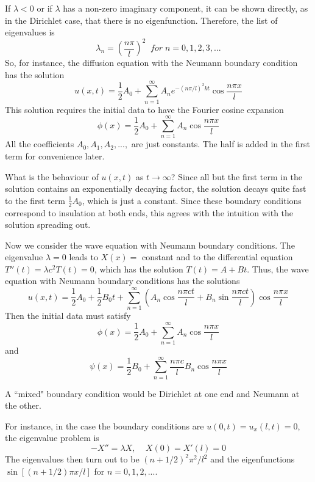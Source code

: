 \documentclass[12pt, a4paper, oneside, openright, titlepage]{book}
\begin{document}
If $\lambda < 0$ or if $\lambda$ has a non-zero imaginary component, it can be shown directly, as in the Dirichlet case, that there is no eigenfunction. Therefore, the list of eigenvalues is \begin{equation}
    \boxed{\lambda_n = \left(\frac{n\pi}{l}\right)^2\;\;for\;n = 0,1,2,3,...}
\end{equation}
So, for instance, the diffusion equation with the Neumann boundary condition has the solution \begin{equation}
    u(x,t) = \frac{1}{2}A_0 + \sum_{n=1}^{\infty}A_ne^{-(n\pi/l)^2kt}\cos\frac{n\pi x}{l}
\end{equation}
This solution requires the initial data to have the Fourier cosine expansion \begin{equation}
    \phi(x) = \frac{1}{2}A_0+\sum_{n=1}^{\infty}A_n\cos\frac{n\pi x}{l}
\end{equation}
All the coefficients $A_0,A_1,A_2,...,$ are just constants. The half is added in the first term for convenience later.

What is the behaviour of $u(x,t)$ as $t\rightarrow \infty$? Since all but the first term in the solution contains an exponentially decaying factor, the solution decays quite fast to the first term $\frac{1}{2}A_0$, which is just a constant. Since these boundary conditions correspond to insulation at both ends, this agrees with the intuition with the solution spreading out. 

Now we consider the wave equation with Neumann boundary conditions. The eigenvalue $\lambda = 0$ leads to $X(x) = $ constant and to the differential equation $T''(t) = \lambda c^2T(t) = 0$, which has the solution $T(t) = A+Bt$. Thus, the wave equation with Neumann boundary conditions has the solutions \begin{equation}
    \boxed{u(x,t) = \frac{1}{2}A_0+\frac{1}{2}B_0t+\sum_{n=1}^{\infty}\left(A_n\cos\frac{n\pi ct}{l}+B_n\sin\frac{n\pi ct}{l}\right)\cos\frac{n\pi x}{l}}
\end{equation}
Then the initial data must satisfy \begin{equation}
    \phi(x) = \frac{1}{2}A_0+\sum_{n=1}^{\infty}A_n\cos\frac{n\pi x}{l}
\end{equation}
and \begin{equation}
    \psi(x) = \frac{1}{2}B_0+\sum_{n=1}^{\infty}\frac{n\pi c}{l}B_n\cos\frac{n\pi x}{l}
\end{equation}

\begin{defn}
    A ``mixed" boundary condition would be Dirichlet at one end and Neumann at the other.
\end{defn}
For instance, in the case the boundary conditions are $u(0,t) = u_x(l,t) = 0$, the eigenvalue problem is \begin{equation}
    -X''=\lambda X,\;\;\;\;X(0) = X'(l) = 0
\end{equation}
The eigenvalues then turn out to be $(n+1/2)^2\pi^2/l^2$ and the eigenfunctions $\sin[(n+1/2)\pi x/l]$ for $n = 0,1,2,...$.
\end{document}
